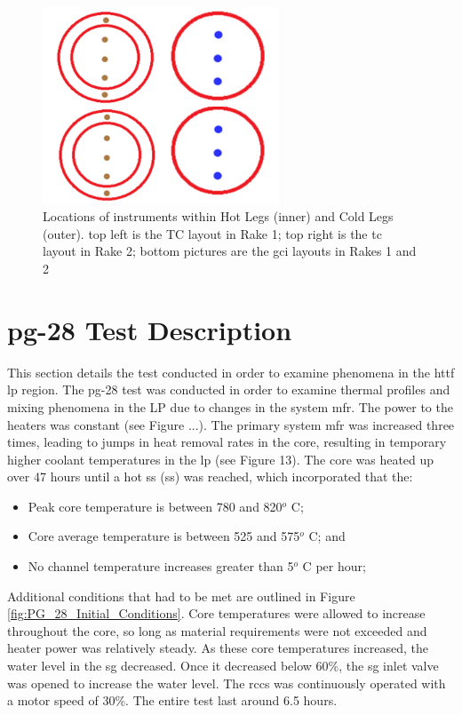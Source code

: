 \documentclass[double,12pt]{beavtex}
\begin{document}
\begin{figure}
    \begin{center}
    	\includegraphics[width=7cm]{Figures/HTTF_HD_Rake_TCs.png}
    	\caption{Locations of instruments within Hot Legs (inner) and Cold Legs (outer). top left is the TC layout in Rake 1; top right is the \acrshort{tc} layout in Rake 2; bottom pictures are the \acrshort{gci} layouts in Rakes 1 and 2}
    	\label{fig:HTTF_HD_Rake_TCs}
    	\end{center}
\end{figure}


\section{\acrshort{pg}-28 Test Description}

This section details the test conducted in order to examine phenomena in the \acrshort{httf} \acrshort{lp} region. The \acrshort{pg}-28 test was conducted in order to examine thermal profiles and mixing phenomena in the LP due to changes in the system \acrshort{mfr}. The power to the heaters was constant (see Figure ...). The primary system \acrshort{mfr} was increased three times, leading to jumps in heat removal rates in the core, resulting in temporary higher coolant temperatures in the \acrshort{lp} (see Figure 13). The core was heated up over 47 hours until a hot \acrlong{ss} (\acrshort{ss}) was reached, which incorporated that the:

\begin{itemize}
    \item Peak core temperature is between 780 and 820$^{o}$ C;
    \item Core average temperature is between 525 and 575$^{o}$ C; and
    \item No channel temperature increases greater than 5$^{o}$ C per hour;
\end{itemize}

Additional conditions that had to be met are outlined in Figure \ref{fig:PG_28_Initial_Conditions}. Core temperatures were allowed to increase throughout the core, so long as material requirements were not exceeded and heater power was relatively steady. As these core temperatures increased, the water level in the \acrshort{sg} decreased. Once it decreased below 60\%, the \acrshort{sg} inlet valve was opened to increase the water level. The \acrshort{rccs} was continuously operated with a motor speed of 30\%. The entire test last around 6.5 hours.
\end{document}
